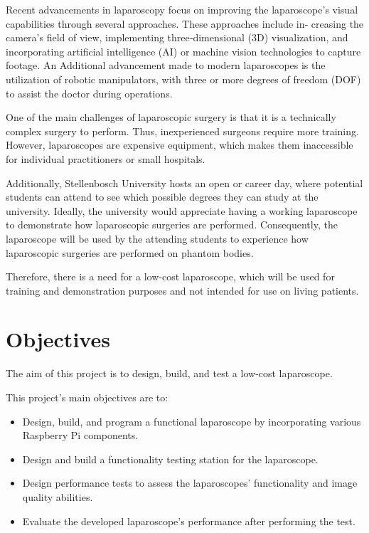 Recent advancements in laparoscopy focus on improving the laparoscope’s visual capabilities through several approaches. These approaches include in‑ creasing the camera’s field of view, implementing three‑dimensional (3D) visualization, and incorporating artificial intelligence (AI) or machine vision technologies to capture footage. An Additional advancement made to modern laparoscopes is the utilization of robotic manipulators, with three or more degrees of freedom (DOF) to assist the doctor during operations. \citep{AIP-2018}


One of the main challenges of laparoscopic surgery is that it is a technically complex surgery to perform. Thus, inexperienced surgeons require more training. However, laparoscopes are expensive equipment, which makes them inaccessible for individual practitioners or small hospitals. \citep{JSE-2014} 

Additionally, Stellenbosch University hosts an open or career day, where potential students can attend to see which possible degrees they can study at the university. Ideally, the university would appreciate having a working laparoscope to demonstrate how laparoscopic surgeries are performed. Consequently, the laparoscope will be used by the attending students to experience how laparoscopic surgeries are performed on phantom bodies. 


Therefore, there is a need for a low‑cost laparoscope, which will be used for training and demonstration purposes and not intended for use on living patients.


\section{Objectives}

The aim of this project is to design, build, and test a low‑cost laparoscope. 



This project's main objectives are to:
\begin{itemize}
    \item Design, build, and program a functional laparoscope by incorporating various Raspberry Pi components.
    \item Design and build a functionality testing station for the laparoscope.
    \item Design performance tests to assess the laparoscopes' functionality and image quality abilities. 
    \item Evaluate the developed laparoscope's performance after performing the test. 
\end{itemize}

